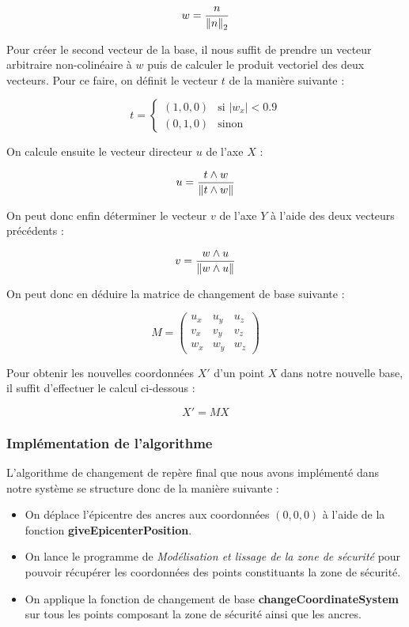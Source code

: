 $$w=\frac{n}{\left\lVert n \right\rVert_2}$$

Pour créer le second vecteur de la base, il nous suffit de prendre un vecteur arbitraire non-colinéaire à $w$ puis de calculer le produit vectoriel des deux vecteurs. Pour ce faire, on définit le vecteur $t$ de la manière suivante : 

\[
t = 
\begin{cases}
   (1, 0, 0) & \text{si } |w_x| < 0.9 \\
   (0, 1, 0) & \text{sinon}
\end{cases}
\]

On calcule ensuite le vecteur directeur $u$ de l'axe $X$ :

$$u=\frac{t \wedge w}{\left\lVert t \wedge w \right\rVert}$$

On peut donc enfin déterminer le vecteur $v$ de l'axe $Y$ à l'aide des deux vecteurs précédents :

$$v=\frac{w \wedge u}{\left\lVert w \wedge u \right\rVert}$$

On peut donc en déduire la matrice de changement de base suivante :

$$M=\begin{pmatrix}
   u_x & u_y & u_z \\
   v_x & v_y & v_z \\
   w_x & w_y & w_z
\end{pmatrix}$$

Pour obtenir les nouvelles coordonnées $X'$ d'un point $X$ dans notre nouvelle base, il suffit d'effectuer le calcul ci-dessous :

$$X'=MX$$

\subsubsection{Implémentation de l'algorithme}

L'algorithme de changement de repère final que nous avons implémenté dans notre système se structure donc de la manière suivante :

\begin{itemize}
   \item On déplace l'épicentre des ancres aux coordonnées $(0, 0, 0)$ à l'aide de la fonction {\ttfamily \textbf{giveEpicenterPosition}}.
   \item On lance le programme de \emph{Modélisation et lissage de la zone de sécurité} pour pouvoir récupérer les coordonnées des points constituants la zone de sécurité.
   \item On applique la fonction de changement de base {\ttfamily \textbf{changeCoordinateSystem}} sur tous les points composant la zone de sécurité ainsi que les ancres.
\end{itemize}

